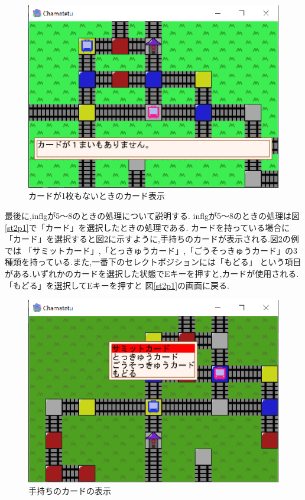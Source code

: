 \documentclass[a4j]{jarticle}
\begin{document}
     \begin{figure}[H]
        \centering
        \includegraphics[scale=1.3]{st2fl4.eps}
        \caption{カードが1枚もないときのカード表示}
         \label{nocard}
        \end{figure}        

        最後に,inflgが5～8のときの処理について説明する. inflgが5～8のときの処理は図\ref{st2p1}で「カード」を選択したときの処理である.
        カードを持っている場合に「カード」を選択すると図\ref{havecard}に示すように,手持ちのカードが表示される.図\ref{havecard}の例では
        「サミットカード」,「とっきゅうカード」,「ごうそっきゅうカード」の3種類を持っている.また,一番下のセレクトポジションには「もどる」
        という項目がある.いずれかのカードを選択した状態でEキーを押すと,カードが使用される.「もどる」を選択してEキーを押すと
        図\ref{st2p1}の画面に戻る.

        \begin{figure}[H]
            \centering
            \includegraphics[scale=1.3]{havacard.eps}
            \caption{手持ちのカードの表示}
             \label{havecard}
            \end{figure}   
        
\end{document}
